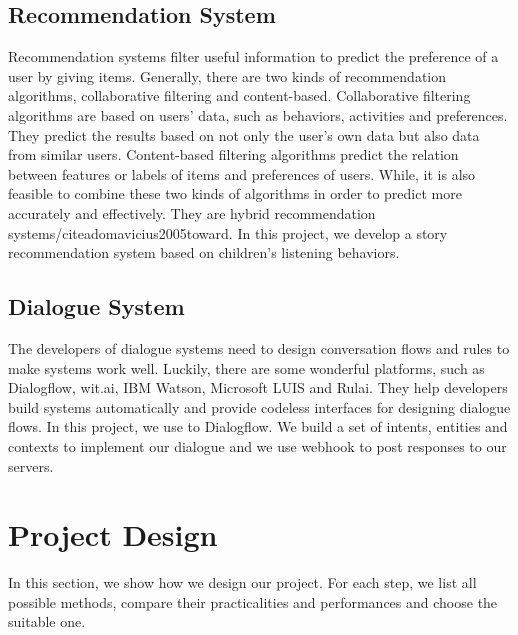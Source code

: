 \documentclass[sigconf]{acmart}
\begin{document}
\subsection{Recommendation System}
Recommendation systems filter useful information to predict the preference of a user by giving items\cite{ricci2011introduction, grossman2010computers}. Generally, there are two kinds of recommendation algorithms, collaborative filtering and content-based\cite{jafarkarimi2012naive}.  Collaborative filtering algorithms are based on users' data, such as behaviors, activities and preferences. They predict the results based on not only the user's own data but also data from similar users\cite{breese1998empirical}. Content-based filtering algorithms predict the relation between features or labels of items and preferences of users\cite{aggarwal2016recommender}. While, it is also feasible to combine these two kinds of algorithms in order to predict more accurately and effectively. They are hybrid recommendation systems/cite{adomavicius2005toward}.
In this project, we develop a story recommendation system based on children's listening behaviors.

\subsection{Dialogue System}
The developers of dialogue systems need to design conversation flows and rules to make systems work well\cite{abdul2015survey}. Luckily, there are some wonderful platforms, such as Dialogflow, wit.ai, IBM Watson, Microsoft LUIS and Rulai. They help developers build systems automatically and provide codeless interfaces for designing dialogue flows\cite{mctear2016introducing}. In this project, we use to Dialogflow. We build a set of intents, entities and contexts to implement our dialogue and we use webhook to post responses to our servers.

\section{Project Design}
In this section, we show how we design our project. For each step, we list all possible methods, compare their practicalities and performances and choose the suitable one.
\end{document}
